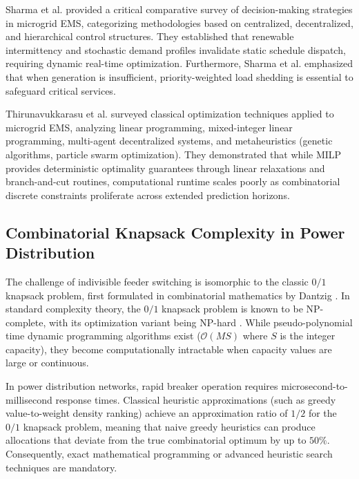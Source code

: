 \documentclass[11pt,a4paper]{article}
\theoremstyle{definition}
\theoremstyle{remark}
\begin{document}
Sharma et al. \cite{sharma2022} provided a critical comparative survey of decision-making strategies in microgrid EMS, categorizing methodologies based on centralized, decentralized, and hierarchical control structures. They established that renewable intermittency and stochastic demand profiles invalidate static schedule dispatch, requiring dynamic real-time optimization. Furthermore, Sharma et al. emphasized that when generation is insufficient, priority-weighted load shedding is essential to safeguard critical services.

Thirunavukkarasu et al. \cite{thirunavukkarasu2022} surveyed classical optimization techniques applied to microgrid EMS, analyzing linear programming, mixed-integer linear programming, multi-agent decentralized systems, and metaheuristics (genetic algorithms, particle swarm optimization). They demonstrated that while MILP provides deterministic optimality guarantees through linear relaxations and branch-and-cut routines, computational runtime scales poorly as combinatorial discrete constraints proliferate across extended prediction horizons.

\subsection{Combinatorial Knapsack Complexity in Power Distribution}
The challenge of indivisible feeder switching is isomorphic to the classic $0/1$ knapsack problem, first formulated in combinatorial mathematics by Dantzig \cite{dantzig1957}. In standard complexity theory, the $0/1$ knapsack problem is known to be NP-complete, with its optimization variant being NP-hard \cite{karp1972}. While pseudo-polynomial time dynamic programming algorithms exist ($\mathcal{O}(M S)$ where $S$ is the integer capacity), they become computationally intractable when capacity values are large or continuous.

In power distribution networks, rapid breaker operation requires microsecond-to-millisecond response times. Classical heuristic approximations (such as greedy value-to-weight density ranking) achieve an approximation ratio of $1/2$ for the $0/1$ knapsack problem, meaning that naive greedy heuristics can produce allocations that deviate from the true combinatorial optimum by up to $50\%$. Consequently, exact mathematical programming or advanced heuristic search techniques are mandatory.
\end{document}
